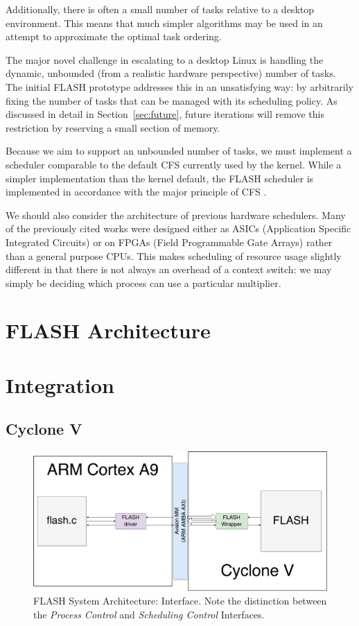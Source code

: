 \documentclass{sig-alternate-10pt}
\begin{document}
Additionally, there is often a small number of tasks relative to a desktop
environment.  This means that much simpler algorithms may be used in an
attempt to approximate the optimal task ordering.

The major novel challenge in escalating to a desktop Linux is handling the
dynamic, unbounded (from a realistic hardware perspective) number of tasks.
The initial FLASH prototype addresses this in an unsatisfying way: by
arbitrarily fixing the number of tasks that can be managed with its
scheduling policy.  As discussed in detail in Section~\ref{sec:future},
future iterations will remove this restriction by reserving a small section
of memory.

Because we aim to support an unbounded number of tasks, we must implement
a scheduler comparable to the default CFS currently used by the kernel.
While a simpler implementation than the kernel default, the FLASH scheduler
is implemented in accordance with the major principle of CFS
\cite{wong2008cfs}.

We should also consider the architecture of previous hardware schedulers.
Many of the previously cited works were designed either as ASICs
(Application Specific Integrated Circuits) or on FPGAs (Field Programmable
Gate Arrays) rather than a general purpose CPUs.  This makes scheduling of
resource usage slightly different in that there is not always an overhead of
a context switch: we may simply be deciding which process can use
a particular multiplier.


\section{FLASH Architecture}
\label{sec:arch}
\lipsum[1-8]


\section{Integration}
\label{sec:integration}
\subsection{Cyclone V}
\begin{figure}
	\begin{center}
		\includegraphics[width=0.9\linewidth]{fig/sockit-architecture.png}
		\caption{
			FLASH System Architecture: Interface.  Note the distinction between
			the \emph{Process Control} and \emph{Scheduling Control} Interfaces.
		}
		\label{fig:sockit_overview}
	\end{center}
\end{figure}
\end{document}
